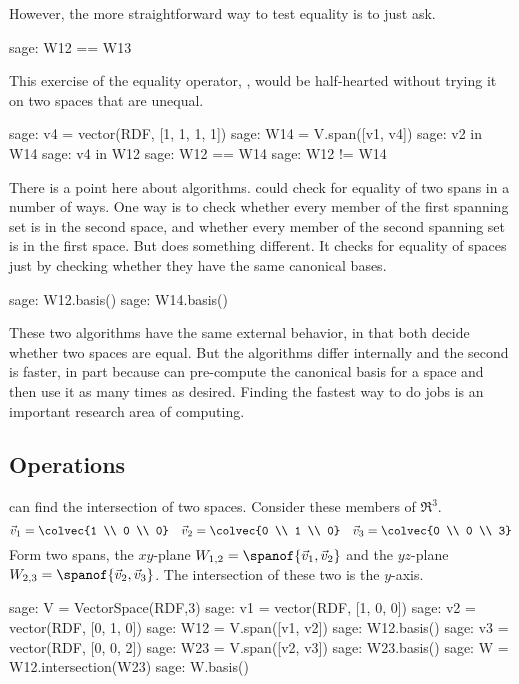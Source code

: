 However, the more straightforward way to test equality is to just ask.
\begin{sagecommandline}
sage: W12 == W13
\end{sagecommandline}
This exercise of the equality operator, \inlinecode{==}, 
would be half-hearted without trying it on two spaces that are
unequal. 
\begin{sagecommandline}
sage: v4 = vector(RDF, [1, 1, 1, 1])
sage: W14 = V.span([v1, v4])
sage: v2 in W14
sage: v4 in W12
sage: W12 == W14
sage: W12 != W14
\end{sagecommandline}

There is a point here about algorithms.
\Sage{} could check for equality of two spans in a number of ways.
One way is to check whether every member of the first spanning set is in the
second space, and whether every member of the second spanning set is in the 
first space. 
But \Sage{} does something different.
It checks for equality of spaces
just by checking whether they have the same canonical bases.
\begin{sagecommandline}
sage: W12.basis()
sage: W14.basis()
\end{sagecommandline}
These two algorithms 
have the same external behavior, in that both decide whether
two spaces are equal.
But the algorithms differ internally and the second is faster, 
in part because \Sage{} can pre-compute the canonical basis for a space
and then use it as many times as desired.
Finding the fastest way to do jobs is an important research area of computing.


\subsection{Operations}
\Sage{} can find the intersection of two spaces.
Consider these members of $\Re^3$.
\begin{equation*}
  \vec{v}_1=\colvec{1 \\ 0 \\ 0}
  \quad \vec{v}_2=\colvec{0 \\ 1 \\ 0}
  \quad \vec{v}_3=\colvec{0 \\ 0 \\ 3}
\end{equation*}
Form two spans, the $xy$-plane $W_{1,2}=\spanof{\vec{v}_1, \vec{v}_2}$ 
and the $yz$-plane $W_{2,3}=\spanof{\vec{v}_2, \vec{v}_3}$.
The intersection of these two is the $y$-axis. 
\begin{sagecommandline}
sage: V = VectorSpace(RDF,3)
sage: v1 = vector(RDF, [1, 0, 0])
sage: v2 =  vector(RDF, [0, 1, 0])
sage: W12 = V.span([v1, v2])
sage: W12.basis()
sage: v3 = vector(RDF, [0, 0, 2])
sage: W23 = V.span([v2, v3])
sage: W23.basis()
sage: W = W12.intersection(W23)
sage: W.basis()
\end{sagecommandline}

